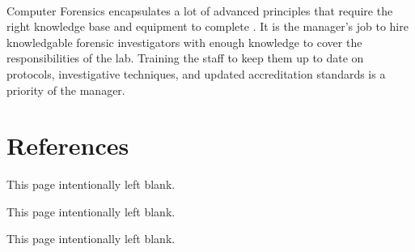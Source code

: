 \documentclass[12pt]{article}
\begin{document}
\paragraph{} 
Computer Forensics encapsulates a lot of advanced principles that require the right knowledge base and equipment to complete \cite{website}. 
It is the manager's job to hire knowledgable forensic investigators with enough knowledge to cover the responsibilities of the lab. 
Training the staff to keep them up to date on protocols, investigative techniques, and updated accreditation standards is a priority of the manager.
\newpage \section{References} \printbibliography[heading=none]
\newpage \begin{center} This page intentionally left blank. \end{center}
\newpage \begin{center} This page intentionally left blank. \end{center}
\newpage \begin{center} This page intentionally left blank. \end{center}
\end{document}
